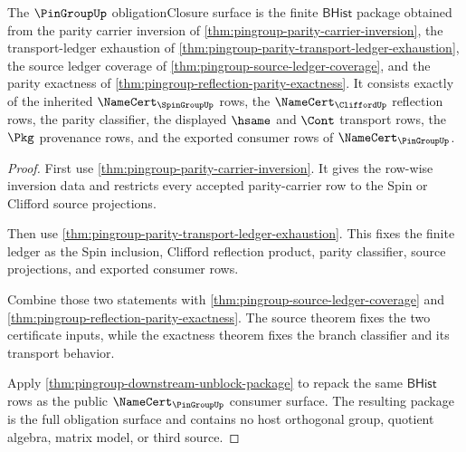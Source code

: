 \begin{theorem}
\label{thm:pingroup-parity-namecert-obligation-surface}
The $\PinGroupUp$ obligationClosure surface is the finite
$\mathsf{BHist}$ package obtained from the parity carrier inversion of
\autoref{thm:pingroup-parity-carrier-inversion}, the transport-ledger
exhaustion of \autoref{thm:pingroup-parity-transport-ledger-exhaustion}, the
source ledger coverage of \autoref{thm:pingroup-source-ledger-coverage}, and
the parity exactness of \autoref{thm:pingroup-reflection-parity-exactness}.
It consists exactly of the inherited $\NameCert_{\SpinGroupUp}$ rows, the
$\NameCert_{\CliffordUp}$ reflection rows, the parity classifier, the displayed
$\hsame$ and $\Cont$ transport rows, the $\Pkg$ provenance rows, and the
exported consumer rows of $\NameCert_{\PinGroupUp}$.
\end{theorem}
\begin{proof}
First use \autoref{thm:pingroup-parity-carrier-inversion}. It gives the
row-wise inversion data and restricts every accepted parity-carrier row to the
Spin or Clifford source projections.

Then use \autoref{thm:pingroup-parity-transport-ledger-exhaustion}. This fixes
the finite ledger as the Spin inclusion, Clifford reflection product, parity
classifier, source projections, and exported consumer rows.

Combine those two statements with
\autoref{thm:pingroup-source-ledger-coverage} and
\autoref{thm:pingroup-reflection-parity-exactness}. The source theorem fixes
the two certificate inputs, while the exactness theorem fixes the branch
classifier and its transport behavior.

Apply \autoref{thm:pingroup-downstream-unblock-package} to repack the same
$\mathsf{BHist}$ rows as the public $\NameCert_{\PinGroupUp}$ consumer surface.
The resulting package is the full obligation surface and contains no host
orthogonal group, quotient algebra, matrix model, or third source.
\end{proof}


